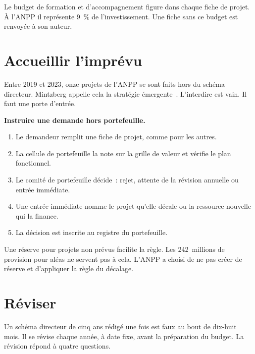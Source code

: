 Le budget de formation et d'accompagnement figure dans chaque fiche de projet. À l'ANPP il représente 9~\% de
l'investissement. Une fiche sans ce budget est renvoyée à son auteur.

\section{Accueillir l'imprévu}
\label{sec:c13-imprevu}

Entre 2019 et 2023, onze projets de l'ANPP se sont faits hors du schéma directeur. Mintzberg appelle cela la
stratégie émergente~\cite{mintzberg1985}. L'interdire est vain. Il faut une porte d'entrée.

\begin{boxprocedure}
\textbf{Instruire une demande hors portefeuille.}
\begin{enumerate}
    \item Le demandeur remplit une fiche de projet, comme pour les autres.
    \item La cellule de portefeuille la note sur la grille de valeur et vérifie le plan fonctionnel.
    \item Le comité de portefeuille décide~: rejet, attente de la révision annuelle ou entrée immédiate.
    \item Une entrée immédiate nomme le projet qu'elle décale ou la ressource nouvelle qui la finance.
    \item La décision est inscrite au registre du portefeuille.
\end{enumerate}
\end{boxprocedure}

Une réserve pour projets non prévus facilite la règle. Les 242~millions de provision pour aléas ne servent pas
à cela. L'ANPP a choisi de ne pas créer de réserve et d'appliquer la règle du décalage.

\section{Réviser}
\label{sec:c13-reviser}

Un schéma directeur de cinq ans rédigé une fois est faux au bout de dix-huit mois. Il se révise chaque année, à
date fixe, avant la préparation du budget. La révision répond à quatre questions.

